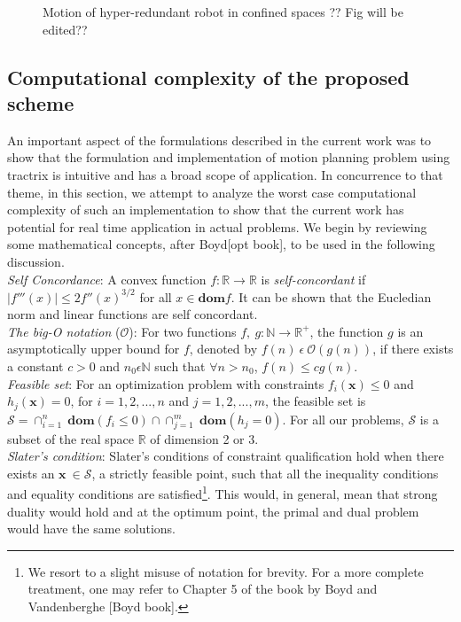 \documentclass[12pt,a4]{article}
\begin{document}
\begin{figure}[ht!]
\begin{subfigure}{0.3\textwidth}
    \end{subfigure}
    \caption{ Motion of hyper-redundant robot in confined spaces ?? Fig will be edited??}
\end{figure}

\subsection{Computational complexity of the proposed scheme}

An important aspect of the formulations described in the current work was to show that the formulation and implementation of motion planning problem using tractrix is intuitive and has a broad scope of application. In concurrence to that theme, in this section, we attempt to analyze the worst case computational complexity of such an implementation to show that the current work has potential for real time application in actual problems. We begin by reviewing some mathematical concepts, after Boyd[opt book], to be used in the following discussion.\\
\indent \textit{Self Concordance}: A convex function $f: \mathbb{R} \to \mathbb{R}$ is \textit{self-concordant} if $|f'''(x)|\leq 2f''(x)^{3/2}$ for all $x \in \textbf{dom}f$. It can be shown that the Eucledian norm and linear functions are self concordant.\\
\indent \textit{The big-O notation} ($\mathcal{O}$): For two functions $f,~g: \mathbb{N}\to \mathbb{R}^+$, the function $g$ is an asymptotically upper bound for $f$, denoted by $f(n)~\epsilon~ \mathcal{O}(g(n))$, if there exists a constant $c>0$ and $n_0\epsilon \mathbb{N}$ such that $\forall n> n_0$, $f(n)\leq cg(n)$.  \\
\indent \textit{Feasible set}: For an optimization problem with constraints $f_i(\textbf{x})\leq 0$ and $h_j(\textbf{x})=0$, for $i=1,2,...,n$ and $j=1,2,...,m$, the feasible set is $\mathcal{S}=\cap_{i=1}^n~\textbf{dom}(f_i\leq0)\cap\cap_{j=1}^m~\textbf{dom}(h_j=0)$. For all our problems, $\mathcal{S} $ is a subset of the real space $\mathbb{R}$ of dimension 2 or 3.\\
\indent \textit{Slater's condition}: Slater's conditions of constraint qualification hold when there exists an $\textbf{x}~ \in \mathcal{S}$, a strictly feasible point,  such that all the inequality conditions and equality conditions are satisfied\footnote{We resort to a slight misuse of notation for brevity. For a more complete treatment, one may refer to Chapter 5 of the book by Boyd and Vandenberghe [Boyd book].}. This would, in general, mean that strong duality would hold and at the optimum point, the primal and dual problem would have the same solutions.\\
\end{document}
